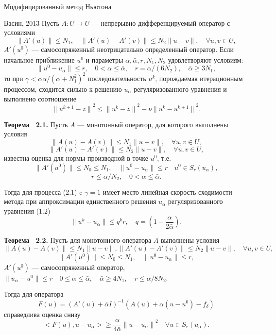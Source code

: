 \documentclass[10pt,pdf, mathserif, hyperref={unicode}]{beamer}
\begin{document}
\begin{frame}{\small Модифицированный метод Ньютона}
	\begin{block}{Васин, 2013}
		Пусть $A: U \to U$ --- непрерывно дифференцируемый оператор с условиями
		$$\|A'(u)\|\le N_1, \quad \|A'(u) - A'(v)\|\le N_2\|u-v\|, \quad \forall u, v \in U,$$
		$A'(u^0)$ --- самосопряженный неотрицательно определенный оператор. Если начальное приближение $u^0$ и параметры $\alpha, \bar{\alpha}, r, N_1, N_2$ удовлетворяют условиям:
		$$\|u^0-u_\alpha\|\le r, \quad 0<\alpha\le \bar{\alpha}, \quad r=\alpha/(6N_2), \quad \bar{\alpha}\ge 3N_1,$$
		то при $\gamma<\alpha\bar{\alpha}/(\alpha+N_1^2)^2$ последовательность $u^k$, порождаемая итерационным процессом, сходится сильно к решению $u_\alpha$ регуляризованного уравнения и выполнено соотношение
		$${\|u^{k+1}-z\|}^2\le{\|u^k-z\|}^2-\nu{\|u^k-u^{k+1}\|}^2.$$
	\end{block}
	\let\thefootnote\relax\let\thefootnote\relax{}
\end{frame}
\begin{frame}
	\begin{block}{\bf Теорема ~2.1.} 
		Пусть $A$ --- монотонный оператор, для которого выполнены условия 
		$$\|A(u)-A(v)\|\le N_1\|u-v\|, \quad \forall u, v \in U,$$ 
		$$\|A'(u)-A'(v)\|\le N_2\|u-v\|, \quad \forall u, v \in U,$$
		известна оценка для нормы производной в точке $u^0$, т.е.
		$$	\|A'(u^0)\| \le N_0\le N_1, \quad \|u^0-u_\alpha\| \le r \quad
		u^0 \in S_r(u_\alpha),$$ $$r\le \alpha/N_2, \quad 0<\alpha \le \bar\alpha.$$ 
		
		\smallskip
		Тогда для процесса (2.1) c $\gamma=1$ имеет место линейная скорость сходимости метода при аппроксимации единственного решения $u_\alpha$ регуляризованного уравнения (1.2)
		$$\| u^{k}-u_\alpha \| \le q^kr, \quad q=(1-\frac{\alpha}{2\bar\alpha}).$$
	\end{block}
\end{frame}
\begin{frame}
	\begin{block}{\bf Теорема ~2.2.}
		Пусть для монотонного оператора $A$ выполнены условия $$
		\|A(u)-A(v)\|\le N_1\|u-v\|,
		\|A'(u)-A'(v)\|\le N_2\|u-v\|, \quad \forall u, v \in U,$$
		$$\|A'(u^0)\| \le N_0\le N_1, \quad \|u^0-u_\alpha\| \le r, $$
		\smallskip
		$A'(u^0)$ --- самосопряженный оператор, $\|u_\alpha-u^0\|\le r \quad  
		0\le\alpha\le\bar\alpha,\quad\bar\alpha\ge 4N_1,\quad r\le\alpha/8N_2.$
		\vspace{3mm}
		
		Тогда для оператора
		$$ F(u)=(A'(u)+\bar\alpha I)^{-1}(A(u)+\alpha(u-u^0)-f_\delta) $$
		справедлива оценка снизу
		$$<F(u), u-u_\alpha>\ge\frac{\alpha}{4\bar\alpha}{\|u-u_\alpha\|}^2 \quad \forall u \in S_r(u_\alpha).$$
	\end{block}
\end{frame} 
\end{document}
